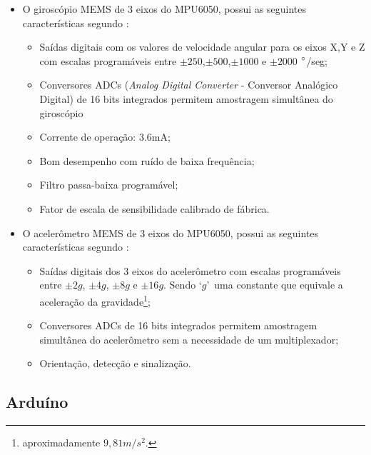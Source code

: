 	\begin{description}
		\item[Características do MPU6050]  
		\item \begin{itemize}	 
		
		\item O giroscópio MEMS de 3 eixos do MPU6050, possui as seguintes características segundo :
			\begin{itemize}
				\item Saídas digitais com os valores de velocidade angular para os eixos X,Y e Z com escalas programáveis entre $ \pm250 $,$ \pm500 $,$ \pm1000 $ e $ \pm 2000$ $\degree$/seg;
				\item Conversores ADCs (\textit{Analog Digital Converter} - Conversor Analógico Digital) de 16 bits integrados permitem amostragem simultânea do giroscópio
				\item Corrente de operação: 3.6mA;
				\item Bom desempenho com ruído de baixa frequência;
				\item Filtro passa-baixa programável;
				\item Fator de escala de sensibilidade calibrado de fábrica.
			\end{itemize}
			
		\item O acelerômetro MEMS de 3 eixos do MPU6050, possui as seguintes características segundo :
			\begin{itemize}
				\item Saídas digitais dos 3 eixos do acelerômetro com escalas programáveis entre $\pm2g$, $\pm4g$, $\pm8g$ e $\pm16g$. Sendo \textquoteleft$ g$\textquoteright \ uma constante que equivale a aceleração da gravidade\footnote{aproximadamente $9,81 m/s^2 $.};
				\item Conversores ADCs de 16 bits integrados permitem amostragem simultânea do acelerômetro sem a necessidade de um multiplexador;
				\item Orientação, detecção e sinalização.
				
			\end{itemize}
		\end{itemize}
	\end{description}
	
	
	

\subsection{Arduíno}

